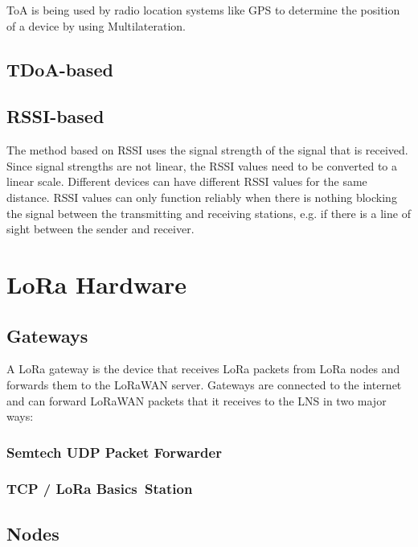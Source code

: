 \ac{ToA} is being used by radio location systems like \ac{GPS} to determine the position of a device by using Multilateration.

\subsection{\acs{TDoA}-based}



\subsection{\acs{RSSI}-based}

The method based on \acf{RSSI} uses the signal strength of the signal that is received.
Since signal strengths are not linear, the \ac{RSSI} values need to be converted to a linear scale.
Different devices can have different \ac{RSSI} values for the same distance.
\ac{RSSI} values can only function reliably when there is nothing blocking the signal between the transmitting and receiving stations, e.g. if there is a line of sight between the sender and receiver.

\section{\ac{LoRa} Hardware}

\subsection{Gateways}

A \ac{LoRa} gateway is the device that receives \ac{LoRa} packets from \ac{LoRa} nodes and forwards them to the \ac{LoRaWAN} server.
Gateways are connected to the internet and can forward \ac{LoRaWAN} packets that it receives to the \ac{LNS} in two major ways:

\subsubsection{Semtech \acs{UDP} Packet Forwarder}


\subsubsection{\acf{TCP} / LoRa Basics\texttrademark~Station}


\subsection{Nodes}